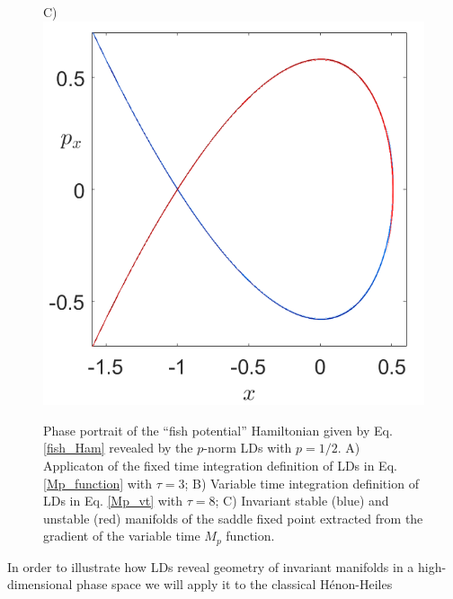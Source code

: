 \documentclass[8pt]{article}
\begin{document}
\begin{figure}[htbp]
\begin{center}
		C)\includegraphics[scale=0.24]{manifolds_fishPot_tau_8.png}
	\end{center}
	\caption{Phase portrait of the ``fish potential'' Hamiltonian given by Eq. \eqref{fish_Ham} revealed by the $p$-norm LDs with $p = 1/2$. A) Applicaton of the fixed time integration definition of LDs in Eq. \eqref{Mp_function} with $\tau = 3$; B) Variable time integration definition of LDs in Eq. \eqref{Mp_vt} with $\tau = 8$; C) Invariant stable (blue) and unstable (red) manifolds of the saddle fixed point  extracted from the gradient of the variable time $M_p$ function.}
	\label{fish_lds}
\end{figure}


In order to illustrate how LDs reveal geometry of invariant manifolds in a high-dimensional phase space we will apply it to the classical H\'enon-Heiles
\end{document}
